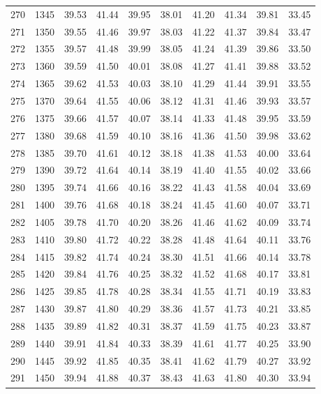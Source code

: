 \begin{longtable}{rrllllllll}
270 & 1345 & 39.53 & 41.44 & 39.95 & 38.01 & 41.20 & 41.34 & 39.81 & 33.45 \\ 
271 & 1350 & 39.55 & 41.46 & 39.97 & 38.03 & 41.22 & 41.37 & 39.84 & 33.47 \\ 
272 & 1355 & 39.57 & 41.48 & 39.99 & 38.05 & 41.24 & 41.39 & 39.86 & 33.50 \\ 
273 & 1360 & 39.59 & 41.50 & 40.01 & 38.08 & 41.27 & 41.41 & 39.88 & 33.52 \\ 
274 & 1365 & 39.62 & 41.53 & 40.03 & 38.10 & 41.29 & 41.44 & 39.91 & 33.55 \\ 
275 & 1370 & 39.64 & 41.55 & 40.06 & 38.12 & 41.31 & 41.46 & 39.93 & 33.57 \\ 
276 & 1375 & 39.66 & 41.57 & 40.07 & 38.14 & 41.33 & 41.48 & 39.95 & 33.59 \\ 
277 & 1380 & 39.68 & 41.59 & 40.10 & 38.16 & 41.36 & 41.50 & 39.98 & 33.62 \\ 
278 & 1385 & 39.70 & 41.61 & 40.12 & 38.18 & 41.38 & 41.53 & 40.00 & 33.64 \\ 
279 & 1390 & 39.72 & 41.64 & 40.14 & 38.19 & 41.40 & 41.55 & 40.02 & 33.66 \\ 
280 & 1395 & 39.74 & 41.66 & 40.16 & 38.22 & 41.43 & 41.58 & 40.04 & 33.69 \\ 
281 & 1400 & 39.76 & 41.68 & 40.18 & 38.24 & 41.45 & 41.60 & 40.07 & 33.71 \\ 
282 & 1405 & 39.78 & 41.70 & 40.20 & 38.26 & 41.46 & 41.62 & 40.09 & 33.74 \\ 
283 & 1410 & 39.80 & 41.72 & 40.22 & 38.28 & 41.48 & 41.64 & 40.11 & 33.76 \\ 
284 & 1415 & 39.82 & 41.74 & 40.24 & 38.30 & 41.51 & 41.66 & 40.14 & 33.78 \\ 
285 & 1420 & 39.84 & 41.76 & 40.25 & 38.32 & 41.52 & 41.68 & 40.17 & 33.81 \\ 
286 & 1425 & 39.85 & 41.78 & 40.28 & 38.34 & 41.55 & 41.71 & 40.19 & 33.83 \\ 
287 & 1430 & 39.87 & 41.80 & 40.29 & 38.36 & 41.57 & 41.73 & 40.21 & 33.85 \\ 
288 & 1435 & 39.89 & 41.82 & 40.31 & 38.37 & 41.59 & 41.75 & 40.23 & 33.87 \\ 
289 & 1440 & 39.91 & 41.84 & 40.33 & 38.39 & 41.61 & 41.77 & 40.25 & 33.90 \\ 
290 & 1445 & 39.92 & 41.85 & 40.35 & 38.41 & 41.62 & 41.79 & 40.27 & 33.92 \\ 
291 & 1450 & 39.94 & 41.88 & 40.37 & 38.43 & 41.63 & 41.80 & 40.30 & 33.94 \\ 

\end{longtable}
